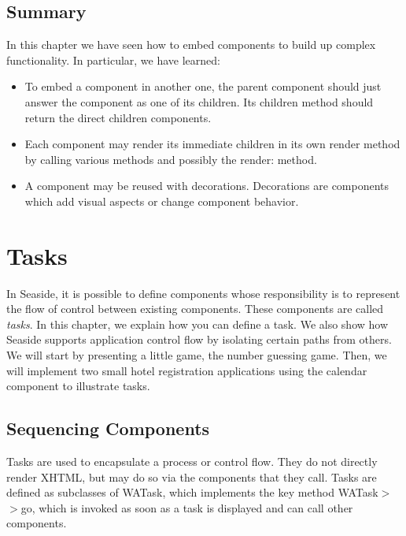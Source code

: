 \documentclass[a4paper,10pt,twoside]{book}
\newcommand{\ct}[1]{{\small\ttfamily\textup{#1}}}
\begin{document}
\section{Summary}
\label{book:components:embedding:summary}

In this chapter we have seen how to embed components to build up complex functionality. In particular, we have learned:

\begin{itemize}
\item  To embed a component in another one, the parent component should just answer the component as one of its children. Its \ct{children} method should return the direct children components.
\item  Each component may render its immediate children in its own render method by calling various methods and possibly the \ct{render:} method.
\item  A component may be reused with decorations. Decorations are components which add visual aspects or change component behavior.
\end{itemize}

\chapter{Tasks}
\label{book:components:tasks}

In Seaside, it is possible to define components whose responsibility is to represent the flow of control between existing components. These components are called \textit{tasks}. In this chapter, we explain how you can define a task. We also show how Seaside supports application control flow by isolating certain paths from others. We will start by presenting a little game, the number guessing game. Then, we will implement two small hotel registration applications using the calendar component to illustrate tasks.

\section{Sequencing Components}
\label{book:components:tasks:sequencingcomponents}

Tasks are used to encapsulate a process or control flow. They do not directly render XHTML, but may do so via the components that they call. Tasks are defined as subclasses of  \ct{WATask}, which implements the key method  \ct{WATask$>$$>$go}, which is invoked as soon as a task is displayed and can call other components.
\end{document}
